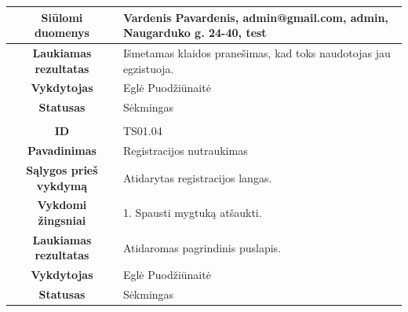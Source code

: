 \documentclass{VUMIFPSkursinis}
\begin{document}
	\begin{table}[H]
			\begin{tabular}{|p{6cm}|p{11cm}|}
			\hline
			\multicolumn{1}{|c|}{{\bfseries Siūlomi duomenys}}&
			{Vardenis Pavardenis, admin@gmail.com, admin, Naugarduko g. 24-40, test}\\
			\hline
			\multicolumn{1}{|c|}{{\bfseries Laukiamas rezultatas}}&
			{Išmetamas klaidos pranešimas, kad toks naudotojas jau egzistuoja.}\\
			\hline
			\multicolumn{1}{|c|}{{\bfseries Vykdytojas}}&
			{Eglė Puodžiūnaitė}\\
			\hline
			\multicolumn{1}{|c|}{{\bfseries Statusas}}&
			{Sėkmingas}\\
			\rowcolor{lightgray}
			\multicolumn{2}{|c|}{}\\
			\hline
			\multicolumn{1}{|c|}{{\bfseries ID}}&
			{TS01.04}\\
			\hline
			\multicolumn{1}{|c|}{{\bfseries Pavadinimas}}&
			{Registracijos nutraukimas}\\
			\hline
			\multicolumn{1}{|c|}{{\bfseries Sąlygos prieš vykdymą}}&
			{Atidarytas registracijos langas.}\\
			\hline
			\multicolumn{1}{|c|}{{\bfseries Vykdomi žingsniai}}&
			{1. Spausti mygtuką atšaukti.}\\
			\hline
			\multicolumn{1}{|c|}{{\bfseries Laukiamas rezultatas}}&
			{Atidaromas pagrindinis puslapis.}\\
			\hline
			\multicolumn{1}{|c|}{{\bfseries Vykdytojas}}&
			{Eglė Puodžiūnaitė}\\
			\hline
			\multicolumn{1}{|c|}{{\bfseries Statusas}}&
			{Sėkmingas}\\
			\hline
		\end{tabular}
	\end{table}
\end{document}
